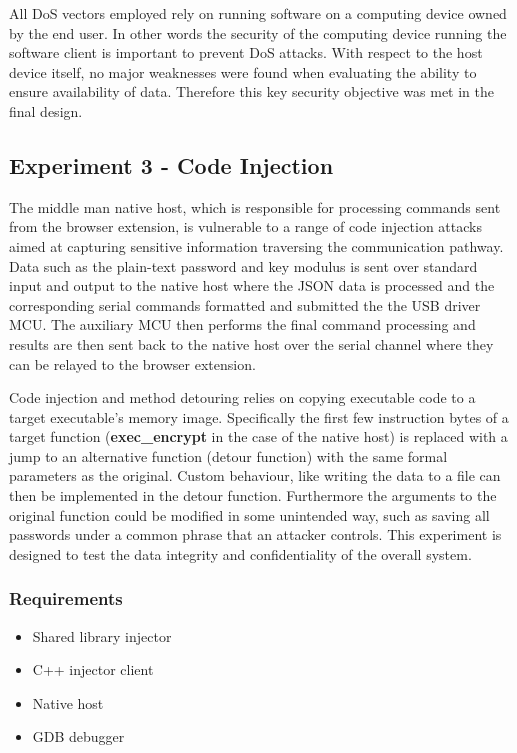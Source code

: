 All DoS vectors employed rely on running software on a computing device owned by the end user. In other words the security of the computing device running the software client is important to prevent DoS attacks. With respect to the host device itself, no major weaknesses were found when evaluating the ability to ensure availability of data. Therefore this key security objective was met in the final design.

\subsection{Experiment 3 - Code Injection}

The middle man native host, which is responsible for processing commands sent from the browser extension, is vulnerable to a range of code injection attacks aimed at capturing sensitive information traversing the communication pathway. Data such as the plain-text password and key modulus is sent over standard input and output to the native host where the JSON data is processed and the corresponding serial commands formatted and submitted the the USB driver MCU. The auxiliary MCU then performs the final command processing and results are then sent back to the native host over the serial channel where they can be relayed to the browser extension.

Code injection and method detouring relies on copying executable code to a target executable's memory image. Specifically the first few instruction bytes of a target function (\textbf{exec\_encrypt} in the case of the native host) is replaced with a jump to an alternative function (detour function) with the same formal parameters as the original. Custom behaviour, like writing the data to a file can then be implemented in the detour function. Furthermore the arguments to the original function could be modified in some unintended way, such as saving all passwords under a common phrase that an attacker controls. This experiment is designed to test the data integrity and confidentiality of the overall system.

\subsubsection{Requirements}

\begin{itemize}
  \item Shared library injector
  \item C++ injector client
  \item Native host
  \item GDB debugger
\end{itemize}


